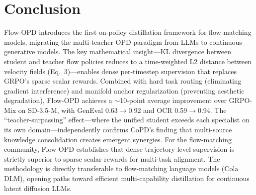 \documentclass[11pt]{article}
\begin{document}
\section{Conclusion}

Flow-OPD introduces the first on-policy distillation framework for flow matching models, migrating the multi-teacher OPD paradigm from LLMs to continuous generative models. The key mathematical insight---KL divergence between student and teacher flow policies reduces to a time-weighted L2 distance between velocity fields (Eq.\ 3)---enables dense per-timestep supervision that replaces GRPO's sparse scalar rewards. Combined with hard task routing (eliminating gradient interference) and manifold anchor regularization (preventing aesthetic degradation), Flow-OPD achieves a $\sim$10-point average improvement over GRPO-Mix on SD-3.5-M, with GenEval 0.63$\to$0.92 and OCR 0.59$\to$0.94. The ``teacher-surpassing'' effect---where the unified student exceeds each specialist on its own domain---independently confirms CoPD's finding that multi-source knowledge consolidation creates emergent synergies. For the flow-matching community, Flow-OPD establishes that dense trajectory-level supervision is strictly superior to sparse scalar rewards for multi-task alignment. The methodology is directly transferable to flow-matching language models (Cola DLM), opening paths toward efficient multi-capability distillation for continuous latent diffusion LLMs.
\end{document}
